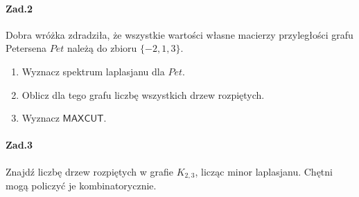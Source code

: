 \paragraph{Zad.2} Dobra wróżka zdradziła, że wszystkie wartości własne macierzy przyległości grafu Petersena $Pet$ należą do zbioru $\{-2, 1, 3\}$.
\begin{enumerate}[label=\alph*)]
\item Wyznacz spektrum laplasjanu dla $Pet$.
\item Oblicz dla tego grafu liczbę wszystkich drzew rozpiętych.
\item Wyznacz $\mathsf{MAXCUT}$.
\end{enumerate}

\paragraph{Zad.3} Znajdź liczbę drzew rozpiętych w grafie $K_{2,3}$, licząc minor laplasjanu. Chętni mogą policzyć je kombinatorycznie.

